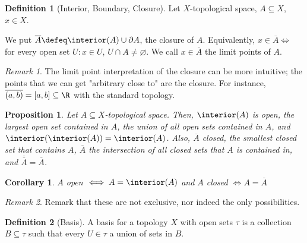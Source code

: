 \documentclass[12pt, oneside]{article}
\theoremstyle{definition}
\newtheorem{defn}{Definition}
\theoremstyle{plain}
\newtheorem{cor}{Corollary}
\newtheorem{prop}{Proposition}
\theoremstyle{remark}
\newtheorem{remark}{Remark}
\begin{document}
\begin{defn}[Interior, Boundary, Closure]
  Let $X$-topological space, $A \subseteq X$, $x \in X$. 
  We put $\overline{A} \defeq \interior(A) \cup \partial A$, the closure of $A$. Equivalently, $x \in \overline{A} \iff$ for every open set $U : x \in U$, $U \cap A \neq \varnothing$. We call $x \in \overline{A}$ the limit points of $A$.
\end{defn}

\begin{remark}
  The limit point interpretation of the closure can be more intuitive; the points that we can get "arbitrary close to" are the closure. For instance, $\overline{(a, b)} = [a, b] \subseteq \R$ with the standard topology. 
\end{remark}

\begin{prop}
  Let $A \subseteq X$-topological space. Then, $\interior(A)$ is open, the largest open set contained in $A$, the union of all open sets contained in $A$, and $\interior(\interior(A)) = \interior(A)$. Also, $\overline{A}$ closed, the smallest closed set that contains $A$, $\overline{A}$ the intersection of all closed sets that $A$ is contained in, and $\overline{\overline{A}} = \overline{A}$.
\end{prop}

\begin{cor}
  $A$ open $\iff A = \interior(A)$ and $A$ closed $\iff A = \overline{A}$
\end{cor}

\begin{remark}
  Remark that these are not exclusive, nor indeed the only possibilities.
\end{remark}

\begin{defn}[Basis]
  A basis for a topology $X$ with open sets $\tau$ is a collection $B \subseteq \tau$ such that every $U\in \tau$ a union of sets in $B$.
\end{defn}
\end{document}
